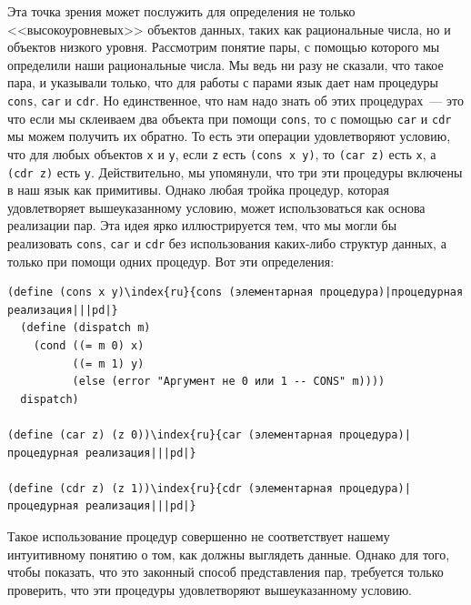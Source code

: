 %
%
Эта точка зрения может послужить для определения не только
<<высокоуровневых>> объектов данных, таких как рациональные числа, но
и объектов низкого уровня.  Рассмотрим понятие пары, с помощью которого
мы определили наши рациональные числа.  Мы ведь ни разу
не сказали, что такое пара, и указывали только, что для работы с парами 
язык дает нам процедуры {\tt cons}, {\tt car} и 
{\tt cdr}.  Но единственное, что нам надо
знать об этих процедурах~--- это что если мы  склеиваем два объекта
при помощи {\tt cons}, то с помощью {\tt car} и
{\tt cdr} мы можем получить их обратно.  То есть эти операции
удовлетворяют условию, что для любых объектов {\tt x} и
{\tt y}, если {\tt z} есть {\tt (cons x y)}, то
{\tt (car z)} есть {\tt x}, 
%
%
а {\tt (cdr z)} есть
%
{\tt y}.  Действительно, мы упомянули, что три эти процедуры
включены в наш язык как примитивы.  Однако любая тройка процедур,
которая удовлетворяет вышеуказанному условию, может использоваться как 
основа реализации пар.  Эта идея ярко иллюстрируется тем, что мы могли 
бы реализовать {\tt cons}, {\tt car} и 
{\tt cdr} без использования каких-либо структур данных, а
только при помощи одних процедур.  Вот эти определения:

\begin{Verbatim}[fontsize=\small]
(define (cons x y)\index{ru}{cons (элементарная процедура)|процедурная реализация|||pd|}
  (define (dispatch m)
    (cond ((= m 0) x)
          ((= m 1) y)
          (else (error "Аргумент не 0 или 1 -- CONS" m))))
  dispatch)

(define (car z) (z 0))\index{ru}{car (элементарная процедура)|процедурная реализация|||pd|}

(define (cdr z) (z 1))\index{ru}{cdr (элементарная процедура)|процедурная реализация|||pd|}
\end{Verbatim}
Такое использование процедур совершенно не соответствует нашему
интуитивному понятию о том, как должны выглядеть данные.  Однако для
того, чтобы показать, что это законный способ представления
пар, требуется только проверить, что эти процедуры удовлетворяют вышеуказанному
условию. %

